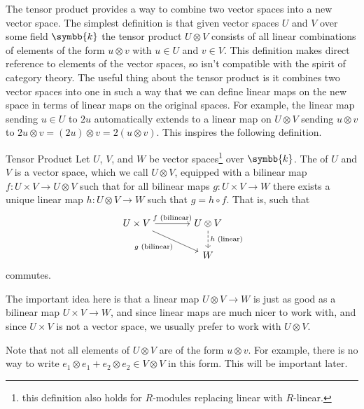 \documentclass[fleqn]{NotesClass}
\renewcommand{\field}{\symbb{k}}
\renewcommand{\ve}[1]{e_{#1}}
\begin{document}
    The tensor product provides a way to combine two vector spaces into a new vector space.
    The simplest definition is that given vector spaces \(U\) and \(V\) over some field \(\field\) the tensor product \(U \otimes V\) consists of all linear combinations of elements of the form \(u \otimes v\) with \(u \in U\) and \(v \in V\).
    This definition makes direct reference to elements of the vector spaces, so isn't compatible with the spirit of category theory.
    The useful thing about the tensor product is it combines two vector spaces into one in such a way that we can define linear maps on the new space in terms of linear maps on the original spaces.
    For example, the linear map sending \(u \in U\) to \(2u\) automatically extends to a linear map on \(U \otimes V\) sending \(u \otimes v\) to \(2u \otimes v = (2u) \otimes v = 2(u \otimes v)\).
    This inspires the following definition.
    
    \begin{dfn}{Tensor Product}{}
        Let \(U\), \(V\), and \(W\) be vector spaces\footnote{this definition also holds for \(R\)-modules replacing linear with \(R\)-linear.} over \(\field\).
        The  of \(U\) and \(V\) is a vector space, which we call \(U \otimes V\), equipped with a bilinear map \(f \colon U \times V \to U \otimes V\) such that for all bilinear maps \(g \colon U \times V \to W\) there exists a unique linear map \(h \colon U \otimes V \to W\) such that \(g = h \circ f\).
        That is, such that
        \begin{equation}
            \begin{tikzcd}[column sep=large]
                U \times V \arrow[r, "f \text{ (bilinear)}"] \arrow[dr, "g \text{ (bilinear)}"'] & U \otimes V \arrow[d, dashed, "h \text{ (linear)}"]\\
                & W
            \end{tikzcd}
        \end{equation}
        commutes.
    \end{dfn}
    
    The important idea here is that a linear map \(U \otimes V \to W\) is just as good as a bilinear map \(U \times V \to W\), and since linear maps are much nicer to work with, and since \(U \times V\) is not a vector space, we usually prefer to work with \(U \otimes V\).
    
    Note that not all elements of \(U \otimes V\) are of the form \(u \otimes v\).
    For example, there is no way to write \(\ve{1} \otimes \ve{1} + \ve{2} \otimes \ve{2} \in V \otimes V\) in this form.
    This will be important later.
    
\end{document}
